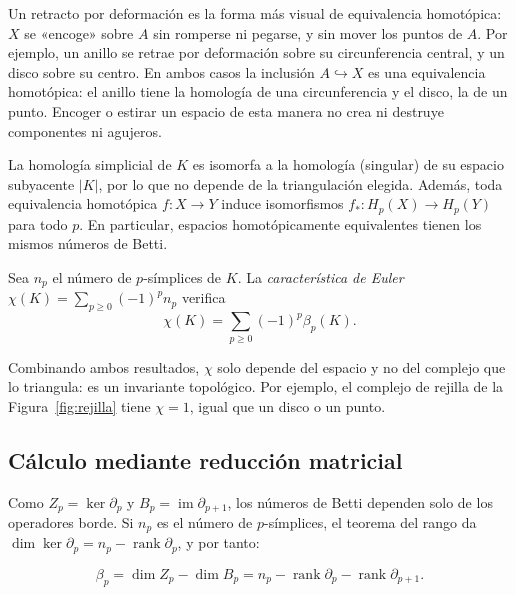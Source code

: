 Un retracto por deformación es la forma más visual de equivalencia
homotópica: $X$ se «encoge» sobre $A$ sin romperse ni pegarse, y sin mover
los puntos de $A$. Por ejemplo, un anillo se retrae por deformación sobre
su circunferencia central, y un disco sobre su centro. En ambos casos la
inclusión $A\hookrightarrow X$ es una equivalencia homotópica: el anillo
tiene la homología de una circunferencia y el disco, la de un punto.
Encoger o estirar un espacio de esta manera no crea ni destruye
componentes ni agujeros.
\begin{teorema}
La homología simplicial de $K$ es isomorfa a la homología (singular) de su
espacio subyacente $|K|$, por lo que no depende de la triangulación
elegida. Además, toda equivalencia homotópica $f:X\to Y$ induce
isomorfismos $f_*:H_p(X)\to H_p(Y)$ para todo $p$. En particular, espacios
homotópicamente equivalentes tienen los mismos números de Betti.
\end{teorema}

\begin{proposicion}
Sea $n_p$ el número de $p$-símplices de $K$. La \emph{característica de
Euler} $\chi(K)=\sum_{p\ge0}(-1)^p n_p$ verifica
\[
  \chi(K)=\sum_{p\ge0}(-1)^p\beta_p(K).
\]
\end{proposicion}

Combinando ambos resultados, $\chi$ solo depende del espacio y no del
complejo que lo triangula: es un invariante topológico. Por ejemplo, el
complejo de rejilla de la Figura~\ref{fig:rejilla} tiene $\chi=1$, igual
que un disco o un punto.

\subsection{Cálculo mediante reducción matricial}
\label{sec:reduccion}

Como $Z_p=\ker\partial_p$ y $B_p=\operatorname{im}\partial_{p+1}$, los
números de Betti dependen solo de los operadores borde. Si $n_p$ es el
número de $p$-símplices, el teorema del rango da
$\dim\ker\partial_p=n_p-\operatorname{rank}\partial_p$, y por tanto:

\begin{proposicion}
\[
  \beta_p=\dim Z_p-\dim B_p
         =n_p-\operatorname{rank}\partial_p-\operatorname{rank}\partial_{p+1}.
\]
\end{proposicion}

